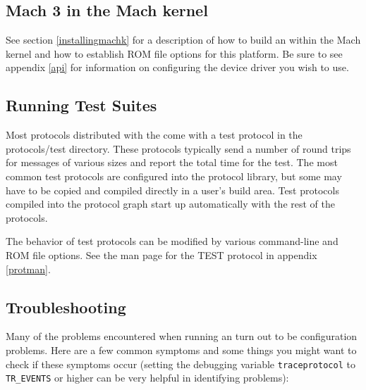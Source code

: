 \subsection{Mach 3 \xk{} in the Mach kernel}

See section 
\ref{installingmachk} for a description of how to build an \xk{} within
the Mach kernel and how to establish ROM file options for this
platform.  Be sure to see appendix \ref{api} for information on
configuring the device driver you wish to use.



\subsection{Running Test Suites}

Most protocols distributed with the \xk{} come with a test protocol in
the {\sanss protocols/test} directory.  These protocols typically send
a number of round trips for messages of various sizes and report the
total time for the test.  The most common test protocols are
configured into the protocol library, but some may have to be copied
and compiled directly in a user's build area.  Test protocols compiled
into the protocol graph start up automatically with the rest of the
protocols.

The behavior of test protocols can be modified by various
command-line and ROM file options.  See the man page for the TEST
protocol in appendix \ref{protman}.


\subsection{Troubleshooting}

Many of the problems encountered when running an \xk{} turn out to be
configuration problems.  Here are a few common symptoms and some
things you might want to check if these symptoms occur (setting the
debugging variable {\tt traceprotocol} to {\tt TR\_EVENTS} or higher
can be very helpful in identifying problems):

